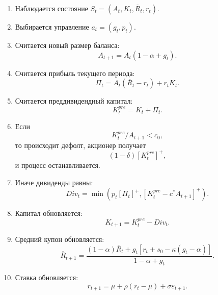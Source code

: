 \documentclass[11pt,a4paper]{article}
\newcommand{\1}{\mathbf{1}}
\newcommand{\pos}[1]{\left[#1\right]^+}
\begin{document}
\begin{enumerate}[label=\arabic*.]
    \item Наблюдается состояние $S_t=(A_t,K_t,\overline{R}_t,r_t)$.
    \item Выбирается управление $a_t=(g_t,p_t)$.
    \item Считается новый размер баланса:
    \begin{equation}
        A_{t+1}=A_t(1-\alpha+g_t).
    \end{equation}
    \item Считается прибыль текущего периода:
    \begin{equation}
        \Pi_t=A_t(\overline{R}_t-r_t)+r_tK_t.
    \end{equation}
    \item Считается преддивидендный капитал:
    \begin{equation}
        K_t^{pre}=K_t+\Pi_t.
    \end{equation}
    \item Если
    \begin{equation}
        K_t^{pre}/A_{t+1}<c_0,
    \end{equation}
    то происходит дефолт, акционер получает
    \begin{equation}
        (1-\delta)\pos{K_t^{pre}},
    \end{equation}
    и процесс останавливается.
    \item Иначе дивиденды равны:
    \begin{equation}
        Div_t=\min\left(p_t\pos{\Pi_t},\pos{K_t^{pre}-c^*A_{t+1}}\right).
    \end{equation}
    \item Капитал обновляется:
    \begin{equation}
        K_{t+1}=K_t^{pre}-Div_t.
    \end{equation}
    \item Средний купон обновляется:
    \begin{equation}
        \overline{R}_{t+1}
        =
        \frac{(1-\alpha)\overline{R}_t + g_t\left[r_t+s_0-\kappa(g_t-\alpha)\right]}
        {1-\alpha+g_t}.
    \end{equation}
    \item Ставка обновляется:
    \begin{equation}
        r_{t+1}=\mu+\rho(r_t-\mu)+\sigma\varepsilon_{t+1}.
    \end{equation}
\end{enumerate}
\end{document}
